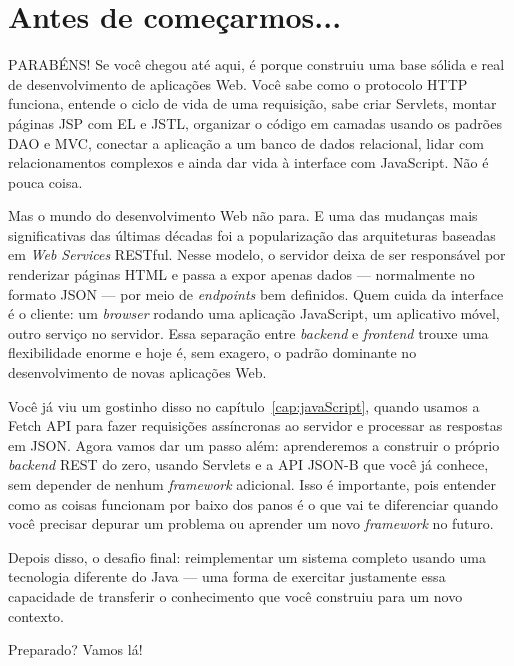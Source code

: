 \chapter*{Antes de começarmos...}

\lettrine[lines=4, lhang=0.1, lraise=0, loversize=0.2, findent=0.1em]{\textcolor{corTema}{P}}{ARABÉNS!} Se você chegou até aqui, é porque construiu uma base sólida e real de desenvolvimento de aplicações Web. Você sabe como o protocolo HTTP funciona, entende o ciclo de vida de uma requisição, sabe criar Servlets, montar páginas JSP com EL e JSTL, organizar o código em camadas usando os padrões DAO e MVC, conectar a aplicação a um banco de dados relacional, lidar com relacionamentos complexos e ainda dar vida à interface com JavaScript. Não é pouca coisa.

Mas o mundo do desenvolvimento Web não para. E uma das mudanças mais significativas das últimas décadas foi a popularização das arquiteturas baseadas em \textit{Web Services} RESTful. Nesse modelo, o servidor deixa de ser responsável por renderizar páginas HTML e passa a expor apenas dados --- normalmente no formato JSON --- por meio de \textit{endpoints} bem definidos. Quem cuida da interface é o cliente: um \textit{browser} rodando uma aplicação JavaScript, um aplicativo móvel, outro serviço no servidor. Essa separação entre \textit{backend} e \textit{frontend} trouxe uma flexibilidade enorme e hoje é, sem exagero, o padrão dominante no desenvolvimento de novas aplicações Web.

Você já viu um gostinho disso no capítulo~\ref{cap:javaScript}, quando usamos a Fetch API para fazer requisições assíncronas ao servidor e processar as respostas em JSON. Agora vamos dar um passo além: aprenderemos a construir o próprio \textit{backend} REST do zero, usando Servlets e a API JSON-B que você já conhece, sem depender de nenhum \textit{framework} adicional. Isso é importante, pois entender como as coisas funcionam por baixo dos panos é o que vai te diferenciar quando você precisar depurar um problema ou aprender um novo \textit{framework} no futuro.

Depois disso, o desafio final: reimplementar um sistema completo usando uma tecnologia diferente do Java --- uma forma de exercitar justamente essa capacidade de transferir o conhecimento que você construiu para um novo contexto.

Preparado? Vamos lá!
